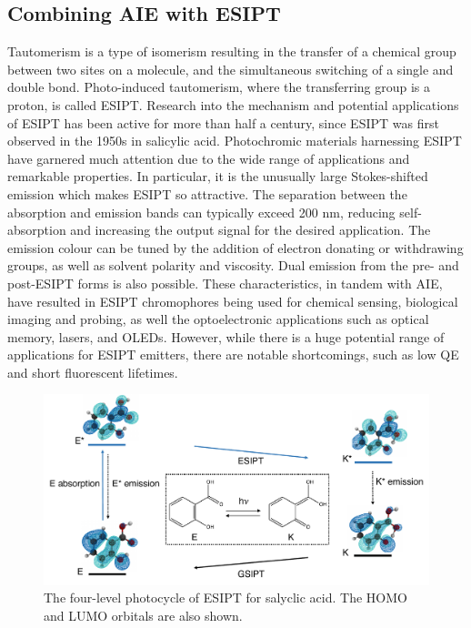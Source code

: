 \subsection{Combining AIE with ESIPT}
Tautomerism is a type of isomerism resulting in the transfer of a chemical group between two sites on a molecule, and the simultaneous switching of a single and double bond. Photo-induced tautomerism, where the transferring group is a proton, is called \acf{ESIPT}. Research into the mechanism and potential applications of ESIPT has been active for more than half a century, since \ac{ESIPT} was first observed in the 1950s in salicylic acid.\cite{Weller1955} Photochromic materials harnessing \ac{ESIPT} have garnered much attention due to the wide range of applications and remarkable properties. In particular, it is the unusually large Stokes-shifted emission which makes \ac{ESIPT} so attractive. The separation between the absorption and emission bands can typically exceed 200 nm, reducing self-absorption and increasing the output signal for the desired application. The emission colour can be tuned by the addition of electron donating or withdrawing groups, as well as solvent polarity and viscosity.\cite{Azarias2016,Yushchenko2007} Dual emission from the pre- and post-\ac{ESIPT} forms is also possible. These characteristics, in tandem with \ac{AIE}, have resulted in \ac{ESIPT} chromophores being used for chemical sensing, biological imaging and probing, as well the optoelectronic applications such as optical memory, lasers, and \acp{OLED}.\cite{Hsieh2010,Kwon2011,Zhao2012,Demchenko2013,Padalkar2015,Chen2018} However, while there is a huge potential range of applications for ESIPT emitters, there are notable shortcomings, such as low \ac{QE} and short fluorescent lifetimes.\cite{Padalkar2015} 
\begin{figure}[t]
\centering
  \includegraphics[width=0.95\linewidth]{1Intro/ESIPT.pdf}
  \caption[The four-level photocycle of ESIPT]{The four-level photocycle of \ac{ESIPT} for salyclic acid. The HOMO and LUMO orbitals are also shown.}
  \label{figure: ESIPT}
\end{figure}
